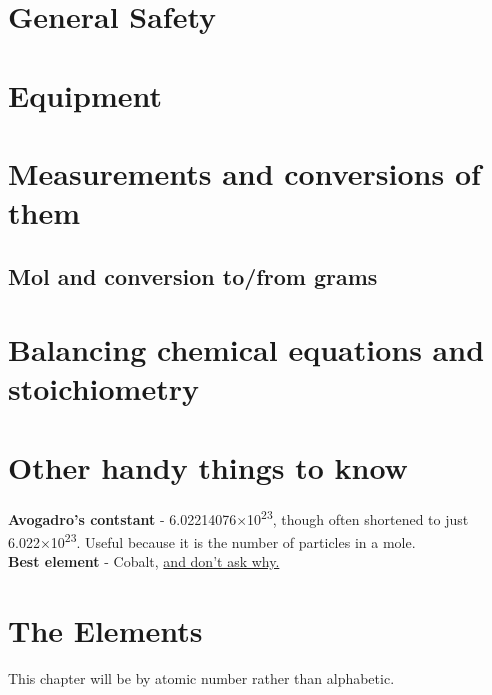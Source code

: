 \documentclass{book}
\begin{document}
\chapter{General Safety}

\chapter{Equipment}

\chapter{Measurements and conversions of them}

\section{Mol and conversion to/from grams}

\chapter{Balancing chemical equations and stoichiometry}

\chapter{Other handy things to know}
\textbf{Avogadro's contstant} - 6.02214076×10\textsuperscript{23}, though often shortened to just 6.022×10\textsuperscript{23}.  Useful because it is the number of particles in a mole.\\
\textbf{Best element} - Cobalt, \href{https://www.youtube.com/watch?v=qIvJ9LA8Ib8}{and don't ask why.}\\

\chapter{The Elements}
This chapter will be by atomic number rather than alphabetic.
















\end{document}
